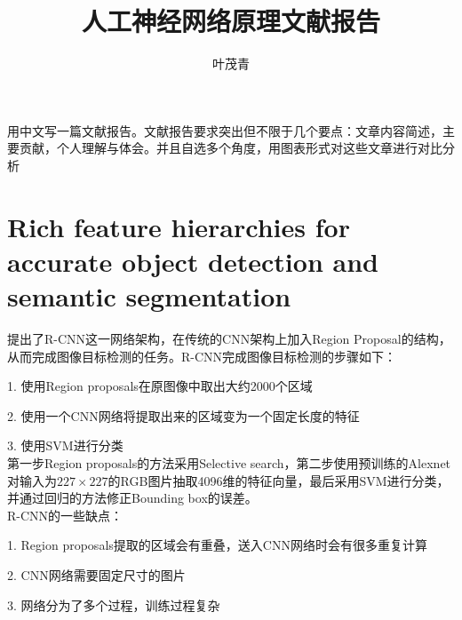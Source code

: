 \documentclass[12pt,onecolumn]{article}
\begin{document}
    \title{人工神经网络原理文献报告}
    \author{叶茂青}

    \maketitle
    用中文写一篇文献报告。文献报告要求突出但不限于几个要点：文章内容简述，主要贡献，个人理解与体会。并且自选多个角度，用图表形式对这些文章进行对比分析


    \section{Rich feature hierarchies for accurate object detection and semantic segmentation\cite{girshick2014rich}}
    提出了R-CNN这一网络架构，在传统的CNN架构上加入Region Proposal的结构，从而完成图像目标检测的任务。R-CNN完成图像目标检测的步骤如下：\par
    1. 使用Region proposals在原图像中取出大约2000个区域\par
    2. 使用一个CNN网络将提取出来的区域变为一个固定长度的特征\par 
    3. 使用SVM进行分类\\
    第一步Region proposals的方法采用Selective search，第二步使用预训练的Alexnet对输入为$227\times 227$的RGB图片抽取4096维的特征向量，最后采用SVM进行分类，并通过回归的方法修正Bounding box的误差。\\
    R-CNN的一些缺点：\par 
    1. Region proposals提取的区域会有重叠，送入CNN网络时会有很多重复计算\par 
    2. CNN网络需要固定尺寸的图片\par 
    3. 网络分为了多个过程，训练过程复杂\par 
\end{document}
